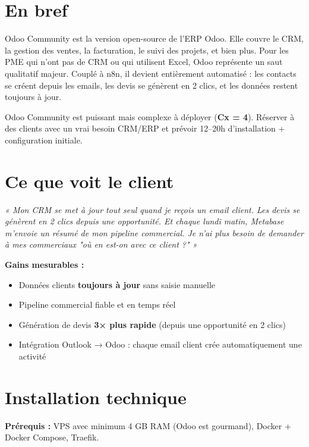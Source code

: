 \documentclass[11pt, a4paper]{article}
\begin{document}
\ficheHeader

\section*{En bref}
Odoo Community est la version open-source de l'ERP Odoo. Elle couvre le CRM, la gestion des ventes, la facturation, le suivi des projets, et bien plus. Pour les PME qui n'ont pas de CRM ou qui utilisent Excel, Odoo représente un saut qualitatif majeur. Couplé à n8n, il devient entièrement automatisé : les contacts se créent depuis les emails, les devis se génèrent en 2 clics, et les données restent toujours à jour.

\begin{pointcle}
  Odoo Community est puissant mais complexe à déployer (\textbf{Cx = 4}). Réserver à des clients avec un vrai besoin CRM/ERP et prévoir 12–20h d'installation + configuration initiale.
\end{pointcle}

\section{Ce que voit le client}

\begin{clientbox}
  \textit{« Mon CRM se met à jour tout seul quand je reçois un email client. Les devis se génèrent en 2 clics depuis une opportunité. Et chaque lundi matin, Metabase m'envoie un résumé de mon pipeline commercial. Je n'ai plus besoin de demander à mes commerciaux "où en est-on avec ce client ?" »}
\end{clientbox}

\textbf{Gains mesurables :}
\begin{itemize}
  \item Données clients \textbf{toujours à jour} sans saisie manuelle
  \item Pipeline commercial fiable et en temps réel
  \item Génération de devis \textbf{3× plus rapide} (depuis une opportunité en 2 clics)
  \item Intégration Outlook → Odoo : chaque email client crée automatiquement une activité
\end{itemize}

\section{Installation technique}

\textbf{Prérequis :} VPS avec minimum 4 GB RAM (Odoo est gourmand), Docker + Docker Compose, Traefik.
\end{document}
